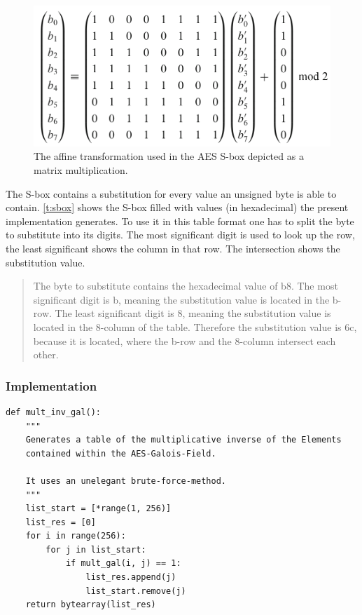 \begin{figure}
\centering
\includegraphics[scale = 0.3]{data/figures/affinetrans.png}
\caption{The affine transformation used in the AES S-box depicted as a matrix multiplication.}
\end{figure}

The S-box contains a substitution for every value an unsigned byte is
able to contain. \ref{t:sbox} shows the S-box filled with values (in
hexadecimal) the present implementation generates. To use it in this
table format one has to split the byte to substitute into its digits.
The most significant digit is used to look up the row, the least
significant shows the column in that row. The intersection shows the
substitution value.

\begin{quote}
The byte to substitute contains the hexadecimal value of b8. The most
significant digit is b, meaning the substitution value is located in the
b-row. The least significant digit is 8, meaning the substitution value
is located in the 8-column of the table. Therefore the substitution
value is 6c, because it is located, where the b-row and the 8-column
intersect each other.
\end{quote}

\hypertarget{implementation-1}{%
\subsubsection{Implementation}\label{implementation-1}}

\begin{lstlisting}
def mult_inv_gal():
    """
    Generates a table of the multiplicative inverse of the Elements
    contained within the AES-Galois-Field.

    It uses an unelegant brute-force-method.
    """
    list_start = [*range(1, 256)]
    list_res = [0]
    for i in range(256):
        for j in list_start:
            if mult_gal(i, j) == 1:
                list_res.append(j)
                list_start.remove(j)
    return bytearray(list_res)
\end{lstlisting}

